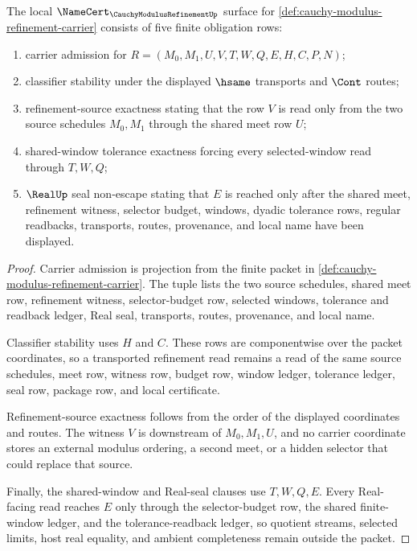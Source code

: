 \begin{theorem}
\label{thm:cauchy-modulus-refinement-namecert-obligations}
The local $\NameCert_{\CauchyModulusRefinementUp}$ surface for \autoref{def:cauchy-modulus-refinement-carrier} consists of five finite obligation rows:
\begin{enumerate}
\item carrier admission for $R=(M_0,M_1,U,V,T,W,Q,E,H,C,P,N)$;
\item classifier stability under the displayed $\hsame$ transports and $\Cont$ routes;
\item refinement-source exactness stating that the row $V$ is read only from the two source schedules $M_0,M_1$ through the shared meet row $U$;
\item shared-window tolerance exactness forcing every selected-window read through $T,W,Q$;
\item $\RealUp$ seal non-escape stating that $E$ is reached only after the shared meet, refinement witness, selector budget, windows, dyadic tolerance rows, regular readbacks, transports, routes, provenance, and local name have been displayed.
\end{enumerate}
\end{theorem}
\begin{proof}
Carrier admission is projection from the finite packet in \autoref{def:cauchy-modulus-refinement-carrier}. The tuple lists the two source schedules, shared meet row, refinement witness, selector-budget row, selected windows, tolerance and readback ledger, Real seal, transports, routes, provenance, and local name.

Classifier stability uses $H$ and $C$. These rows are componentwise over the packet coordinates, so a transported refinement read remains a read of the same source schedules, meet row, witness row, budget row, window ledger, tolerance ledger, seal row, package row, and local certificate.

Refinement-source exactness follows from the order of the displayed coordinates and routes. The witness $V$ is downstream of $M_0,M_1,U$, and no carrier coordinate stores an external modulus ordering, a second meet, or a hidden selector that could replace that source.

Finally, the shared-window and Real-seal clauses use $T,W,Q,E$. Every Real-facing read reaches $E$ only through the selector-budget row, the shared finite-window ledger, and the tolerance-readback ledger, so quotient streams, selected limits, host real equality, and ambient completeness remain outside the packet.
\end{proof}

